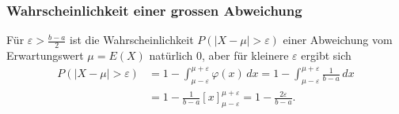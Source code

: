 \subsubsection{Wahrscheinlichkeit einer grossen Abweichung}
{\small
Für $\varepsilon>\frac{b-a}2$ ist die Wahrscheinlichkeit
$P(|X-\mu|>\varepsilon)$
einer Abweichung vom Erwartungswert $\mu=E(X)$ natürlich $0$,
aber für kleinere $\varepsilon$ ergibt sich
\begin{align*}
P(|X-\mu|>\varepsilon)
&=1-\int_{\mu-\varepsilon}^{\mu+\varepsilon}\varphi(x)\,dx
=1-\int_{\mu-\varepsilon}^{\mu+\varepsilon}\frac{1}{b-a}\,dx\\
&=1-\frac1{b-a}\left[x\right]_{\mu-\varepsilon}^{\mu+\varepsilon}=1-\frac{2\varepsilon}{b-a}.
\end{align*}
}
